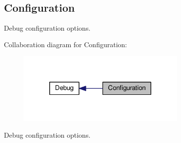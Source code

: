 \hypertarget{group__dbg__cfg}{\subsection{Configuration}
\label{group__dbg__cfg}
}


Debug configuration options.  


Collaboration diagram for Configuration\-:\nopagebreak
\begin{figure}[H]
\begin{center}
\leavevmode
\includegraphics[width=236pt]{group__dbg__cfg}
\end{center}
\end{figure}
Debug configuration options. 